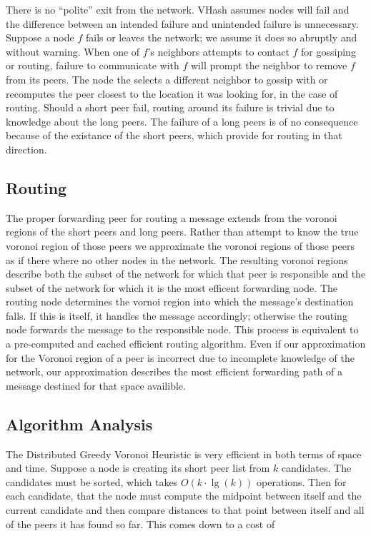 \documentclass{IEEEtran}
\begin{document}
There is no ``polite'' exit from the network. VHash assumes nodes will fail and the difference between an intended failure and unintended failure is unnecessary. 
Suppose a node $f$ fails or leaves the network; we assume it does so abruptly and without warning.
When one of $f$'s neighbors attempts to contact $f$ for gossiping or routing, failure to communicate with $f$ will prompt the neighbor to remove $f$ from its peers.  
The node the selects a different neighbor to gossip with or recomputes the peer closest to the location it was looking for, in the case of routing. 
Should a short peer fail, routing around its failure is trivial due to knowledge about the long peers.  The failure of a long peers is of no consequence because of the existance of the short peers, which provide for routing in that direction.

\subsection{Routing}
The proper forwarding peer for routing a message extends from the voronoi regions of the short peers and long peers.
Rather than attempt to know the true voronoi region of those peers we approximate the voronoi regions of those peers as if there where no other nodes in the network.
The resulting voronoi regions describe both the subset of the network for which that peer is responsible and the subset of the network for which it is the most efficent forwarding node.
The routing node determines the vornoi region into which the message's destination falls.
If this is itself, it handles the message accordingly; otherwise the routing node forwards the message to the responsible node.
This process is equivalent to a pre-computed and cached efficient routing algorithm.
Even if our approximation for the Voronoi region of a peer is incorrect due to incomplete knowledge of the network, our approximation describes the most efficient forwarding path of a message  destined for that space availible.




\subsection{Algorithm Analysis}
The Distributed Greedy Voronoi Heuristic is very efficient in both terms of space and time.  Suppose a node is creating its short peer list from $k$ candidates.  The candidates must be sorted, which takes $O(k\cdot\lg(k))$ operations.  Then for each candidate, that the node must compute the midpoint between itself and the current candidate and then compare distances to that point between itself and all of the peers it has found so far.  This comes down to a cost of 
\end{document}
